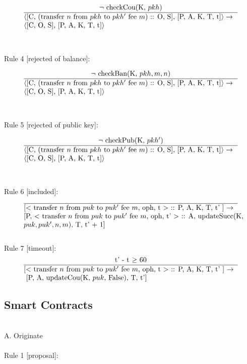 \documentclass[a4paper]{llncs}
\begin{document}
\begin{equation}{}
\frac{\text{$\neg$ checkCou(K, $pkh$)}}{\parbox{4.2in}{\text{$\langle$[C, (transfer $n$ from $pkh$ to $pkh'$ fee $m$) :: O, S], [P, A, K, T, t]$\rangle \rightarrow$ }\\
\text{$\langle$[C, O, S], [P, A, K, T, t]$\rangle$}}} 
\end{equation}
~\\
~\\
Rule 4 [rejected of balance]:

\begin{equation}{}
\frac{\text{$\neg$ checkBan(K, $pkh, m, n$)}}{\parbox{4.2in}{\text{$\langle$[C, (transfer $n$ from $pkh$ to $pkh'$ fee $m$) :: O, S], [P, A, K, T, t]$\rangle \rightarrow$ }\\
\text{$\langle$[C, O, S], [P, A, K, T, t]$\rangle$}}} 
\end{equation}
~\\
~\\
Rule 5 [rejected of public key]:

\begin{equation}{}
\frac{\text{$\neg$ checkPub(K, $pkh'$)}}{\parbox{4.2in}{\text{$\langle$[C, (transfer $n$ from $pkh$ to $pkh'$ fee $m$) :: O, S], [P, A, K, T, t]$\rangle \rightarrow$ }\\
\text{$\langle$[C, O, S], [P, A, K, T, t]$\rangle$}}} 
\end{equation}
~\\
~\\
Rule 6 [included]:
\begin{equation}{}
\frac{}{\parbox{4.2in}{\text{[$<$ transfer $n$ from $puk$ to  $puk'$ fee $m$, oph, t $>$ :: P, A, K, T, t' ] $\rightarrow$ } \\
 \text{[P, $<$ transfer $n$ from  $puk$ to $puk'$ fee $m$, oph, t' $>$ :: A, updateSucc(K, } \\
\text{$puk, puk', n, m$), T, t' + 1]}}} 
\end{equation}
~\\
Rule 7 [timeout]:
\begin{equation}{}
\frac{\text{t' - t $\ge$ 60}}{\parbox{4.2in}{\text{[$<$ transfer $n$ from $puk$ to  $puk'$ fee $m$, oph, t $>$ :: P, A, K, T, t' ] $\rightarrow$} \\
 \hspace*{0cm} \text{[P, A, updateCou(K, $puk$, False), T, t']}}} 
\end{equation}

\subsection{Smart Contracts}
~\\
A. Originate
~\\
~\\
Rule 1 [proposal]:
\end{document}
